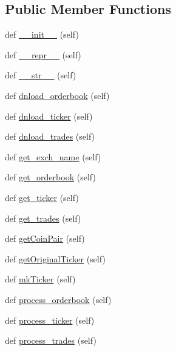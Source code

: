 \subsection*{Public Member Functions}
\begin{DoxyCompactItemize}
\item 
def \hyperlink{classexchange_1_1_exchange_adc6345bd84ea113d46f4e044dbd4d0fb}{\+\_\+\+\_\+init\+\_\+\+\_\+} (self)
\item 
def \hyperlink{classexchange_1_1_exchange_afff4d01a82947f2e3be0d4fa5e0e0fe7}{\+\_\+\+\_\+repr\+\_\+\+\_\+} (self)
\item 
def \hyperlink{classexchange_1_1_exchange_ae3fd515a25ead8667f917230b0975a98}{\+\_\+\+\_\+str\+\_\+\+\_\+} (self)
\item 
def \hyperlink{classexchange_1_1_exchange_a99f32c746467a00b455a97c7805fd710}{dnload\+\_\+orderbook} (self)
\item 
def \hyperlink{classexchange_1_1_exchange_a9e700d31fd60de495956518436b6768a}{dnload\+\_\+ticker} (self)
\item 
def \hyperlink{classexchange_1_1_exchange_a202c8b57ffa0adcb830de89d6466fd60}{dnload\+\_\+trades} (self)
\item 
def \hyperlink{classexchange_1_1_exchange_a8f095bac98d7ad212f93bfcdff458bf7}{get\+\_\+exch\+\_\+name} (self)
\item 
def \hyperlink{classexchange_1_1_exchange_a5d0c05c289d664892ade5edb03adbd6b}{get\+\_\+orderbook} (self)
\item 
def \hyperlink{classexchange_1_1_exchange_aabe7d5679cac0096bc54169cfceea536}{get\+\_\+ticker} (self)
\item 
def \hyperlink{classexchange_1_1_exchange_a254bac1703de55674f5ebfbb03a95e74}{get\+\_\+trades} (self)
\item 
def \hyperlink{classexchange_1_1_exchange_aa0c6b78e855daec381fe180fd4dbbf1e}{get\+Coin\+Pair} (self)
\item 
def \hyperlink{classexchange_1_1_exchange_a6925ebc9654ca9120d70fd0105399dc3}{get\+Original\+Ticker} (self)
\item 
def \hyperlink{classexchange_1_1_exchange_af7512183a26d97ea60a4f44608f40a0a}{mk\+Ticker} (self)
\item 
def \hyperlink{classexchange_1_1_exchange_a93c60cd18eab808d68191fb1d2d42cf8}{process\+\_\+orderbook} (self)
\item 
def \hyperlink{classexchange_1_1_exchange_aa3f83a45154aa4a1b07010f74c2b37db}{process\+\_\+ticker} (self)
\item 
def \hyperlink{classexchange_1_1_exchange_a0e67454c7053807302be914376790484}{process\+\_\+trades} (self)
\end{DoxyCompactItemize}
